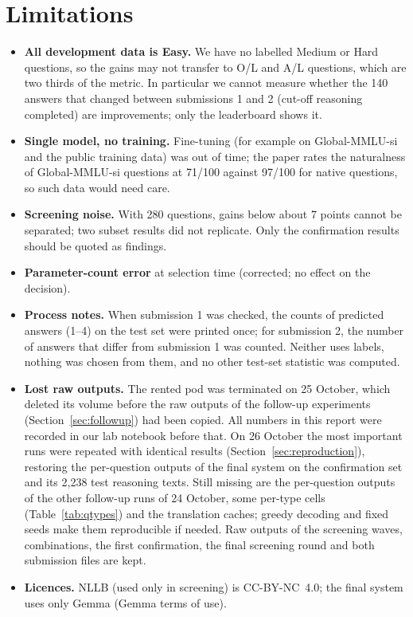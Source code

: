 \documentclass[10pt,a4paper]{article}
\begin{document}
\section{Limitations}\label{sec:limits}
\begin{itemize}
\item \textbf{All development data is Easy.} We have no labelled Medium or Hard questions, so the gains may not transfer
to O/L and A/L questions, which are two thirds of the metric. In particular we cannot measure whether the 140 answers
that changed between submissions 1 and 2 (cut-off reasoning completed) are improvements; only the leaderboard shows it.
\item \textbf{Single model, no training.} Fine-tuning (for example on Global-MMLU-si \cite{globalmmlu2025} and the
public training data) was out of time; the paper rates the naturalness of Global-MMLU-si questions at 71/100
against 97/100 for native questions, so such data would need care.
\item \textbf{Screening noise.} With 280 questions, gains below about 7 points cannot be separated; two subset results
did not replicate. Only the confirmation results should be quoted as findings.
\item \textbf{Parameter-count error} at selection time (corrected; no effect on the decision).
\item \textbf{Process notes.} When submission 1 was checked, the counts of predicted answers (1--4) on the test set
were printed once; for submission 2, the number of answers that differ from submission 1 was counted. Neither uses
labels, nothing was chosen from them, and no other test-set statistic was computed.
\item \textbf{Lost raw outputs.} The rented pod was terminated on 25 October, which deleted its volume before the raw
outputs of the follow-up experiments (Section~\ref{sec:followup}) had been copied. All numbers in this report were
recorded in our lab notebook before that. On 26 October the most important runs were repeated with identical results
(Section~\ref{sec:reproduction}), restoring the per-question outputs of the final system on the confirmation set and
its 2,238 test reasoning texts. Still missing are the per-question outputs of the other follow-up runs of 24 October,
some per-type cells (Table~\ref{tab:qtypes}) and the translation caches; greedy decoding and fixed seeds make them
reproducible if needed. Raw outputs of the screening waves, combinations, the first confirmation, the final screening
round and both submission files are kept.
\item \textbf{Licences.} NLLB (used only in screening) is CC-BY-NC~4.0; the final system uses only Gemma (Gemma
terms of use).
\end{itemize}
\end{document}
